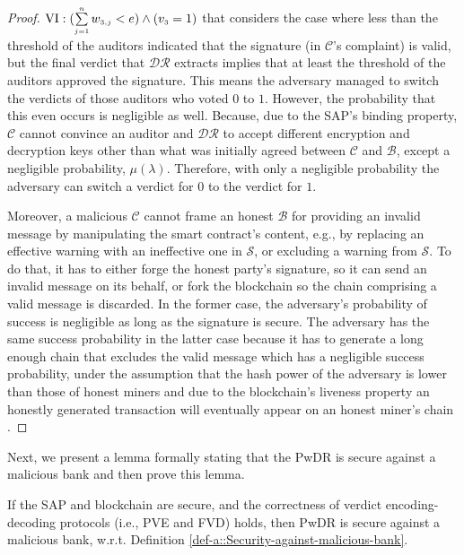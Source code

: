 \begin{proof}
 $\text{\MakeUppercase{\romannumeral 6}}:(\sum\limits_{\st j=1}^{\st n}w_{\st 3,j}< {e}) \wedge ( {v}_{\st 3}=1)$ that considers the case where less than the threshold of the auditors indicated that the signature (in $\mathcal{C}$'s complaint) is valid, but   the final verdict that $\mathcal{DR}$ extracts implies that at least the threshold of the auditors approved the signature. This means the adversary managed to switch the verdicts of those auditors who voted $0$ to $1$. However, the probability that this even occurs is negligible as well. Because, due to the SAP's binding property,  $\mathcal{C}$ cannot convince an auditor and $\mathcal{DR}$ to accept different encryption and decryption keys other than what was initially agreed between $\mathcal{C}$ and $\mathcal{B}$, except a negligible probability, $\mu(\lambda)$.  Therefore, with only a negligible probability the adversary can switch a verdict for $0$ to the verdict for $1$. 
 
 
 Moreover, a malicious $\mathcal{C}$ cannot frame an honest $\mathcal{B}$ for providing an invalid message by manipulating the smart contract’s content,  e.g., by replacing an effective warning with an ineffective one in $\mathcal{S}$, or excluding a warning from $\mathcal{S}$. To do that, it has to either forge the honest party’s signature, so it can send an invalid message on its behalf, or fork the blockchain so the chain comprising a valid message is discarded. In the former case, the adversary’s probability of success is negligible as long as the signature is secure. The adversary has the same success probability in the latter case because it has to generate a long enough chain that excludes the valid message which has a negligible success probability, under the assumption that the hash power of the adversary is lower than those of honest miners and due to the blockchain’s liveness property an honestly generated transaction will eventually appear on an honest miner’s chain \cite{GarayKL15}. 
\end{proof}

\vspace{-2mm}


Next, we present a lemma formally stating that the PwDR is secure against a malicious bank and then prove this lemma. 

\begin{lemma}\label{lemma::secure-against-a-malicious-bank} If the  SAP and blockchain are secure, and the correctness of verdict encoding-decoding protocols (i.e., PVE and FVD) holds, then PwDR is secure against a malicious bank, w.r.t. Definition \ref{def-a::Security-against-malicious-bank}. 
\end{lemma}


